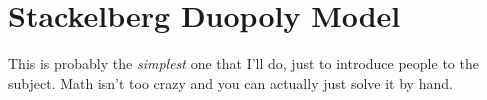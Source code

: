 \section{Stackelberg Duopoly Model}
This is probably the \emph{simplest} one that I'll do, just to introduce people to the subject. Math isn't too crazy and you can actually just solve it by hand.

